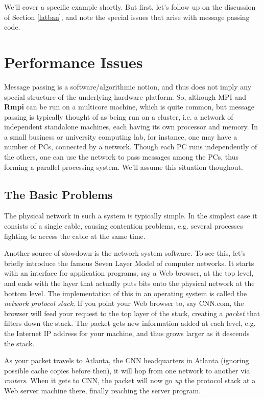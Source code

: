 We'll cover a specific example shortly.  But first, let's follow up on
the discussion of Section \ref{latban}, and note the special issues that
arise with message passing code.

\section{Performance Issues}

Message passing is a software/algorithmic notion, and thus does not
imply any special structure of the underlying hardware platform.  So,
although MPI and {\bf Rmpi} can be run on a multicore machine, which is
quite common,  but message passing is typically thought of as being
run on a cluster, i.e. a network of independent standalone machines, each
having its own processor and memory.  In a small business or university
computing lab, for instance, one may have a number of PCs, connected by
a network.  Though each PC runs independently of the others, one
can use the network to pass messages among the PCs, thus forming a
parallel processing system.  We'll assume this situation thoughout.

\subsection{The Basic Problems}

The physical network in such a system is typically simple.  In the
simplest case it consists of a single cable, causing contention
problems, e.g. several processes fighting to access the cable at the
same time.

Another source of slowdown is the network system software.  To see this,
let's briefly introduce the famous Seven Layer Model of computer
networks.  It starts with an interface for application programs, say a
Web browser, at the top level, and ends with the layer that actually
puts bits onto the physical network at the bottom level.  The
implementation of this in an operating system is called the {\it network
protocol stack}.  If you point your Web browser to, say CNN.com, the
browser will feed your request to the top layer of the stack, creating a
{\it packet} that filters down the stack.  The packet gets new
information added at each level, e.g. the Internet IP address for your
machine, and thus grows larger as it descends the stack.

As your packet travels to Atlanta, the CNN headquarters in Atlanta
(ignoring possible cache copies before then), it will hop from one
network to another via {\it routers}.  When it gets to CNN, the packet
will now go {\it up} the protocol stack at a Web server machine there,
finally reaching the server program.


